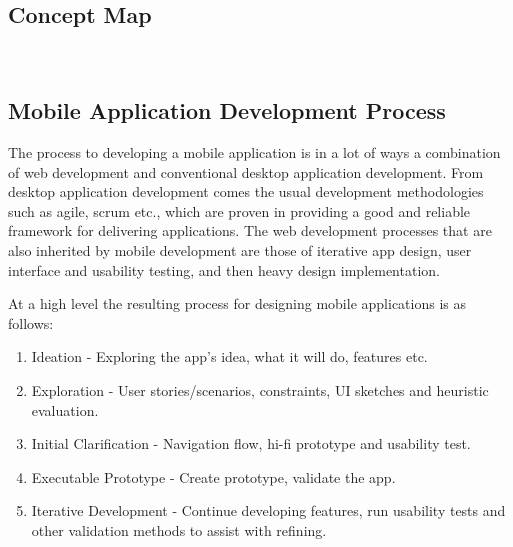\documentclass[11pt,english,numbers=endperiod,parskip=half]{scrartcl}
\begin{document}
  \subsection{Concept Map}
    \begin{figure}[H]
    \\
    \end{figure}
  \subsection{Mobile Application Development Process}
    The process to developing a mobile application is in a lot of ways a
    combination of web development and conventional desktop application development.
    From desktop application development comes the usual development methodologies
    such as agile, scrum etc., which are proven in providing a good and reliable
    framework for delivering applications. The web development processes that
    are also inherited by mobile development are those of iterative app design,
    user interface and usability testing, and then heavy design implementation.

    At a high level the resulting process for designing mobile applications is
    as follows:
    \begin{enumerate}
      \item{
        Ideation - Exploring the app's idea, what it will do, features etc.
      }
      \item{
        Exploration - User stories/scenarios, constraints, UI sketches and
        heuristic evaluation.
      }
      \item{
        Initial Clarification - Navigation flow, hi-fi prototype and usability
        test.
      }
      \item{
        Executable Prototype - Create prototype, validate the app.
      }
      \item{
        Iterative Development - Continue developing features, run usability
        tests and other validation methods to assist with refining.
      }
    \end{enumerate}
\end{document}
